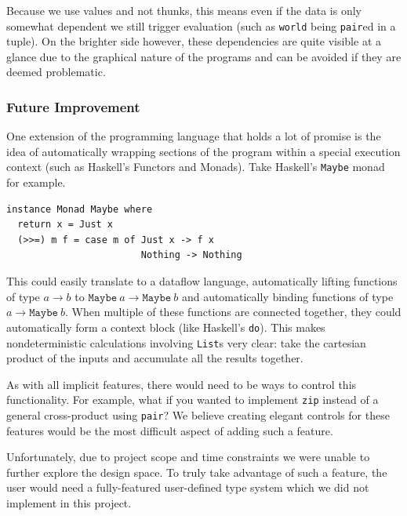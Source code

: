 \documentclass[12pt,UTF8,a4]{article}
\newcommand{\code}[1]{\texttt{#1}}
\newcommand{\type}[1]{\texttt{#1}}
\begin{document}
Because we use values and not thunks, this means even if the data is
only somewhat dependent we still trigger evaluation (such as
\type{world} being \code{pair}ed in a tuple). On the brighter side
however, these dependencies are quite visible at a glance due to the
graphical nature of the programs and can be avoided if they are deemed
problematic.

\subsubsection{Future Improvement}
One extension of the programming language that holds a lot of promise
is the idea of automatically wrapping sections of the program within a
special execution context (such as Haskell's Functors and
Monads). Take Haskell's \code{Maybe} monad for example.
\begin{center}
\begin{verbatim}
instance Monad Maybe where
  return x = Just x
  (>>=) m f = case m of Just x -> f x
                        Nothing -> Nothing
\end{verbatim}
\end{center}

This could easily translate to a dataflow language, automatically
lifting functions of type $a \rightarrow b$ to $\type{Maybe}\ a
\rightarrow \type{Maybe}\ b$ and automatically binding functions of
type $a \rightarrow \type{Maybe}\ b$. When multiple of these functions
are connected together, they could automatically form a context block
(like Haskell's \code{do}). This makes nondeterministic calculations
involving \code{List}s very clear: take the cartesian product of the inputs and accumulate all the results together.

As with all implicit features, there would need to be ways to control
this functionality. For example, what if you wanted to implement
\code{zip} instead of a general cross-product using \code{pair}? We
believe creating elegant controls for these features would be the most
difficult aspect of adding such a feature.

Unfortunately, due to project scope and time constraints we were
unable to further explore the design space. To truly take advantage of
such a feature, the user would need a fully-featured user-defined type
system which we did not implement in this project.
\end{document}
